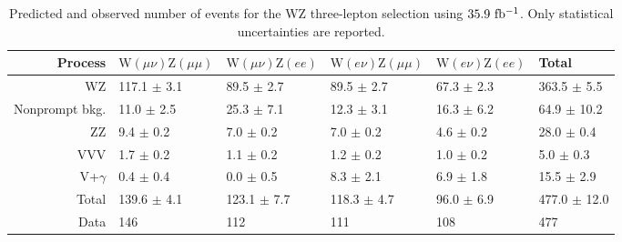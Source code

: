 \setlength{\tabcolsep}{12pt}
\begin{table}[!b]
  \caption{Predicted and observed number of events for the WZ three-lepton selection using $35.9~\mathrm{fb^{-1}}$.
  Only statistical uncertainties are reported.
  \label{tab:wz3lyields}}
  \begin{center}
{\scriptsize
  \begin{tabular}{rlllll}
\hline 
Process & $\mathrm{W}(\mu\nu)\mathrm{Z}(\mu\mu)$ & $\mathrm{W}(\mu\nu)\mathrm{Z}(ee)$ & $\mathrm{W}(e\nu)\mathrm{Z}(\mu\mu)$ & $\mathrm{W}(e\nu)\mathrm{Z}(ee)$ & Total \\
\hline
WZ                    &  117.1 $\pm$ 3.1 &   89.5 $\pm$  2.7 &   89.5 $\pm$ 2.7 &  67.3 $\pm$ 2.3 & 363.5 $\pm$   5.5 \\ 
Nonprompt bkg.        &   11.0 $\pm$ 2.5 &   25.3 $\pm$  7.1 &   12.3 $\pm$ 3.1 &  16.3 $\pm$ 6.2 &  64.9 $\pm$  10.2 \\ 
ZZ                    &    9.4 $\pm$ 0.2 &    7.0 $\pm$  0.2 &    7.0 $\pm$ 0.2 &   4.6 $\pm$ 0.2 &  28.0 $\pm$   0.4 \\ 
VVV                   &    1.7 $\pm$ 0.2 &    1.1 $\pm$  0.2 &    1.2 $\pm$ 0.2 &   1.0 $\pm$ 0.2 &   5.0 $\pm$   0.3 \\ 
V+$\gamma$            &    0.4 $\pm$ 0.4 &    0.0 $\pm$  0.5 &    8.3 $\pm$ 2.1 &   6.9 $\pm$ 1.8 &  15.5 $\pm$   2.9 \\ 
\hline
Total                 &  139.6 $\pm$ 4.1 &  123.1 $\pm$  7.7 &  118.3 $\pm$ 4.7 &  96.0 $\pm$ 6.9 & 477.0 $\pm$  12.0 \\
\hline
Data                  &  146             &  112              &  111             & 108             & 477               \\
\hline
  \end{tabular}
}
  \end{center}
\end{table}

